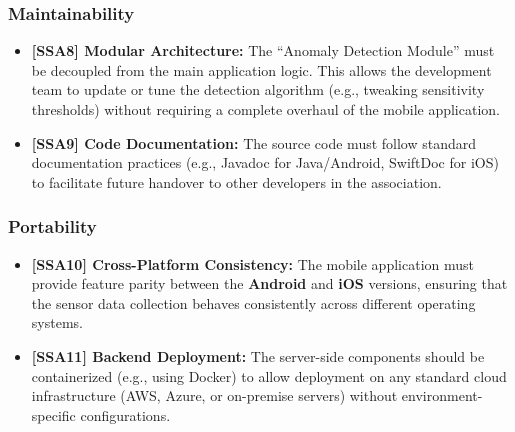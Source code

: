 \subsubsection{Maintainability}
\begin{itemize}
    \item \textbf{[SSA8] Modular Architecture:} The ``Anomaly Detection Module'' must be decoupled from the main application logic. This allows the development team to update or tune the detection algorithm (e.g., tweaking sensitivity thresholds) without requiring a complete overhaul of the mobile application.
    \item \textbf{[SSA9] Code Documentation:} The source code must follow standard documentation practices (e.g., Javadoc for Java/Android, SwiftDoc for iOS) to facilitate future handover to other developers in the association.
\end{itemize}

\subsubsection{Portability}
\begin{itemize}
    \item \textbf{[SSA10] Cross-Platform Consistency:} The mobile application must provide feature parity between the \textbf{Android} and \textbf{iOS} versions, ensuring that the sensor data collection behaves consistently across different operating systems.
    \item \textbf{[SSA11] Backend Deployment:} The server-side components should be containerized (e.g., using Docker) to allow deployment on any standard cloud infrastructure (AWS, Azure, or on-premise servers) without environment-specific configurations.
\end{itemize}

